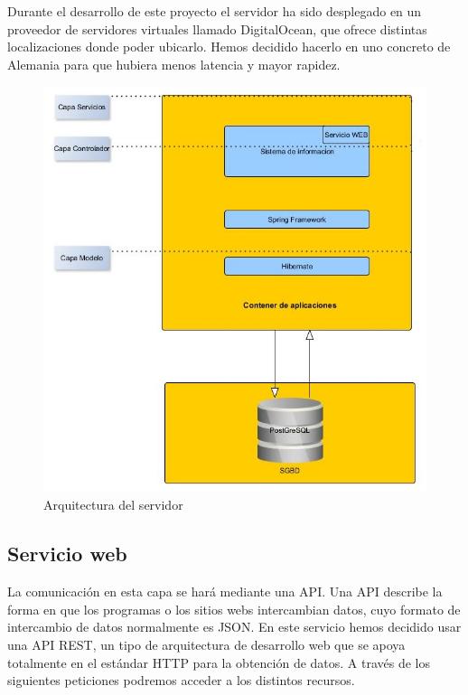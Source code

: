 Durante el desarrollo de este proyecto el servidor ha sido desplegado en un proveedor de servidores virtuales llamado 
  DigitalOcean, que ofrece distintas localizaciones donde poder ubicarlo. Hemos decidido hacerlo en uno concreto de Alemania para que hubiera menos latencia y mayor rapidez.
\begin{figure}
		\centering
		\includegraphics[width=\textwidth] {arquitectura-servidor.jpg}
		\caption{Arquitectura del servidor }
		\label{fig:arquitectura-servidor}
	\end{figure}


\subsection{Servicio web}
 La comunicación en esta capa se hará mediante una API. Una API describe la forma en que los programas o los sitios webs intercambian datos, cuyo formato  de intercambio de datos normalmente es JSON. En este servicio hemos decidido usar una API REST, un tipo de arquitectura de desarrollo web que se apoya totalmente en el estándar HTTP para la obtención de datos. A través de los siguientes peticiones podremos acceder a los distintos recursos.
 

